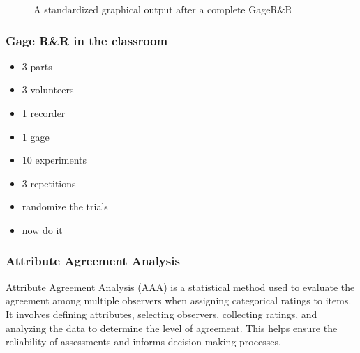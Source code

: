 \documentclass[
  a4paper,
]{scrbook}
\begin{document}
\begin{figure}[ht]


\caption{\label{fig-gagerr-ex}A standardized graphical output after a
complete GageR\&R}

\end{figure}%

\subsubsection{Gage R\&R in the
classroom}\label{gage-rr-in-the-classroom}

\begin{itemize}
\item
  3 parts
\item
  3 volunteers
\item
  1 recorder
\item
  1 gage
\item
  10 experiments
\item
  3 repetitions
\item
  randomize the trials
\item
  now do it
\end{itemize}

\subsubsection{Attribute Agreement
Analysis}\label{attribute-agreement-analysis}

Attribute Agreement Analysis (AAA) is a statistical method used to
evaluate the agreement among multiple observers when assigning
categorical ratings to items. It involves defining attributes, selecting
observers, collecting ratings, and analyzing the data to determine the
level of agreement. This helps ensure the reliability of assessments and
informs decision-making processes.
\end{document}

